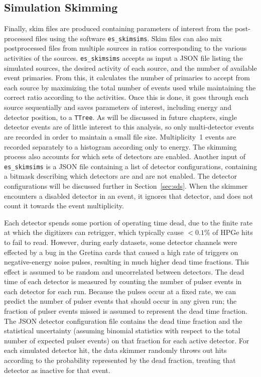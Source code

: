 \documentclass[/main.tex]{subfiles}
\begin{document}
\subsection{Simulation Skimming} \label{sec:simskim}
Finally, skim files are produced containing parameters of interest from the post-processed files using the software \texttt{es\_skimsims}.
Skim files can also mix postprocessed files from multiple sources in ratios corresponding to the various activities of the sources.
\texttt{es\_skimsims} accepts as input a JSON file listing the simulated sources, the desired activity of each source, and the number of available event primaries.
From this, it calculates the number of primaries to accept from each source by maximizing the total number of events used while maintaining the correct ratio according to the activities.
Once this is done, it goes through each source sequentially and saves parameters of interest, including energy and detector position, to a \texttt{TTree}.
As will be discussed in future chapters, single detector events are of little interest to this analysis, so only multi-detector events are recorded in order to maintain a small file size.
Multiplicity~1 events are recorded separately to a histogram according only to energy.
The skimming process also accounts for which sets of detectors are enabled.
Another input of \texttt{es\_skimsims} is a JSON file containing a list of detector configurations, containing a bitmask describing which detectors are and are not enabled.
The detector configurations will be discussed further in Section~\ref{sec:sds}.
When the skimmer encounters a disabled detector in an event, it ignores that detector, and does not count it towards the event multiplicity.
 
Each detector spends some portion of operating time dead, due to the finite rate at which the digitizers can retrigger, which typically cause $<0.1\%$ of HPGe hits to fail to read.
However, during early datasets, some detector channels were effected by a bug in the Gretina cards that caused a high rate of triggers on negative-energy noise pulses, resulting in much higher dead time fractions.
This effect is assumed to be random and uncorrelated between detectors.
The dead time of each detector is measured by counting the number of pulser events in each detector for each run.
Because the pulses occur at a fixed rate, we can predict the number of pulser events that should occur in any given run; the fraction of pulser events missed is assumed to represent the dead time fraction.
The JSON detector configuration file contains the dead time fraction and the statistical uncertainty (assuming binomial statistics with respect to the total number of expected pulser events) on that fraction for each active detector.
For each simulated detector hit, the data skimmer randomly throws out hits according to the probability represented by the dead fraction, treating that detector as inactive for that event.
\end{document}
